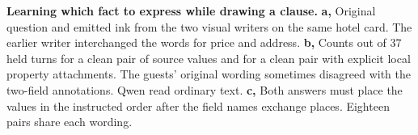 \textbf{Learning which fact to express while drawing a clause.} \textbf{a,} Original question and emitted ink from the two visual writers on the same hotel card. The earlier writer interchanged the words for price and address. \textbf{b,} Counts out of 37 held turns for a clean pair of source values and for a clean pair with explicit local property attachments. The guests' original wording sometimes disagreed with the two-field annotations. Qwen read ordinary text. \textbf{c,} Both answers must place the values in the instructed order after the field names exchange places. Eighteen pairs share each wording.
